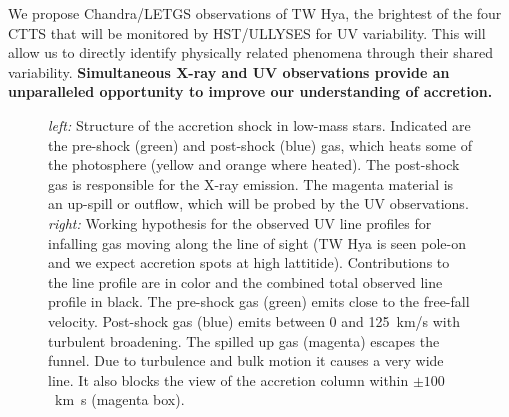 \documentclass[letterpaper,11pt,twocolumn]{article}
\begin{document}
We propose Chandra/LETGS observations of TW Hya, the brightest of the four  CTTS that will be monitored by HST/ULLYSES for UV variability.
This will allow us to directly identify physically related phenomena through
their shared variability. {\bf Simultaneous X-ray and UV
observations provide an unparalleled opportunity to improve
our understanding of accretion.}


\begin{figure}[t]
\centering
{}
\caption{\label{fig:CIVsketch} \emph{left:} Structure of the accretion
  shock in low-mass stars. Indicated are the pre-shock (green) and
  post-shock (blue) gas, which heats some of the photosphere (yellow
  and orange where heated). The post-shock gas is responsible for the
  X-ray emission. The magenta material is an up-spill or outflow,
  which will be probed by the UV observations.  
  \emph{right:}
  Working hypothesis for the observed UV line profiles for infalling gas moving along the line of sight (TW Hya is seen pole-on and we expect accretion spots at high lattitide).
  Contributions to the line profile are in color and the combined total observed line profile in black. 
  The pre-shock gas (green) emits close
  to the free-fall velocity. Post-shock gas (blue) emits
  between 0 and 125~km/s with turbulent broadening. The
  spilled up gas (magenta) escapes the funnel. Due to turbulence and bulk
  motion it causes a very wide line. It also blocks the view of
  the accretion column within $\pm100$~km~s (magenta box).
  }
\end{figure}
\end{document}
